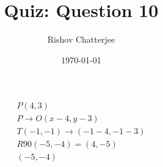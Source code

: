 \documentclass{article}
\begin{document}
\title{Quiz: Question 10}
\author{Rishov Chatterjee}
\date{\today}
\maketitle{}

\begin{center}
\begin{align}
P (4,3) \\
P \rightarrow O (x - 4, y -3) \\
T(-1,-1) \rightarrow (-1 - 4, -1 - 3) \\
R90 (-5, -4) = (4, -5) \\
(-5, -4)
\end{align}
\end{center}
\end{document}
